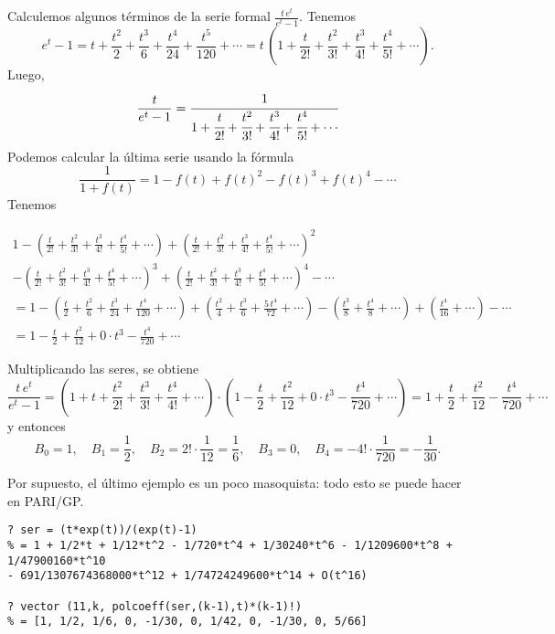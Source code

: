 \documentclass{article}
\begin{document}
\begin{ejemplo*}
Calculemos algunos términos de la serie formal $\frac{t\,e^t}{e^t - 1}$. Tenemos
$$e^t - 1 = t + \frac{t^2}{2} + \frac{t^3}{6} + \frac{t^4}{24} + \frac{t^5}{120} + \cdots = t\,\left(1 + \frac{t}{2!} + \frac{t^2}{3!} + \frac{t^3}{4!} + \frac{t^4}{5!} + \cdots\right).$$
Luego,
$$\frac{t}{e^t - 1} = \cfrac{1}{1 + \cfrac{t}{2!} + \cfrac{t^2}{3!} + \cfrac{t^3}{4!} + \cfrac{t^4}{5!} + \cdots}$$
Podemos calcular la última serie usando la fórmula
$$\frac{1}{1 + f (t)} = 1 - f(t) + f (t)^2 - f(t)^3 + f (t)^4 - \cdots$$ Tenemos

\begin{multline*}
1 -
\left(\frac{t}{2!} + \frac{t^2}{3!} + \frac{t^3}{4!} + \frac{t^4}{5!} + \cdots\right) +
\left(\frac{t}{2!} + \frac{t^2}{3!} + \frac{t^3}{4!} + \frac{t^4}{5!} + \cdots\right)^2\\
- \left(\frac{t}{2!} + \frac{t^2}{3!} + \frac{t^3}{4!} + \frac{t^4}{5!} + \cdots\right)^3 +
\left(\frac{t}{2!} + \frac{t^2}{3!} + \frac{t^3}{4!} + \frac{t^4}{5!} + \cdots\right)^4 - \cdots\\
= 1 -
\left(\frac{t}{2} + \frac{t^2}{6} + \frac{t^3}{24} + \frac{t^4}{120} + \cdots\right) +
\left(\frac{t^2}{4} + \frac{t^3}{6} + \frac{5\,t^4}{72} + \cdots\right) - \left(\frac{t^3}{8} + \frac{t^4}{8} + \cdots\right) + \left(\frac{t^4}{16} + \cdots\right) - \cdots \\
= 1 - \frac{t}{2} + \frac{t^2}{12} + 0\cdot t^3 - \frac{t^4}{720} + \cdots
\end{multline*}

Multiplicando las seres, se obtiene
$$\frac{t\,e^t}{e^t - 1} = \left(1 + t + \frac{t^2}{2!} + \frac{t^3}{3!} + \frac{t^4}{4!} + \cdots\right) \cdot \left(1 - \frac{t}{2} + \frac{t^2}{12} + 0\cdot t^3 - \frac{t^4}{720} + \cdots\right) = 1 + \frac{t}{2} + \frac{t^2}{12} - \frac{t^4}{720} + \cdots$$
y entonces
$$B_0 = 1, \quad B_1 = \frac{1}{2}, \quad B_2 = 2! \cdot \frac{1}{12} = \frac{1}{6}, \quad B_3 = 0, \quad B_4 = -4!\cdot\frac{1}{720} = -\frac{1}{30}.$$
\end{ejemplo*}

\begin{shaded}
\small\noindent Por supuesto, el último ejemplo es un poco masoquista: todo esto se puede hacer en PARI/GP.

\begin{verbatim}
? ser = (t*exp(t))/(exp(t)-1)
% = 1 + 1/2*t + 1/12*t^2 - 1/720*t^4 + 1/30240*t^6 - 1/1209600*t^8 + 1/47900160*t^10
- 691/1307674368000*t^12 + 1/74724249600*t^14 + O(t^16)

? vector (11,k, polcoeff(ser,(k-1),t)*(k-1)!)
% = [1, 1/2, 1/6, 0, -1/30, 0, 1/42, 0, -1/30, 0, 5/66]
\end{verbatim}
\end{shaded}
\end{document}
